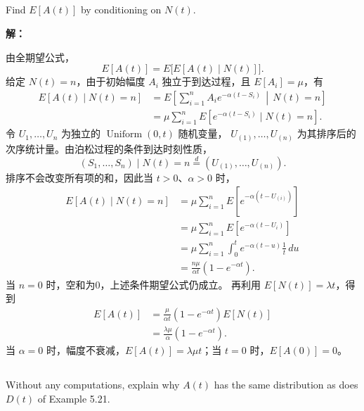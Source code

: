 \documentclass[12pt,a4paper]{article}
\begin{document}
\subsection{}

Find $E[A(t)]$ by conditioning on $N(t)$.

\begin{answerbox}
\textbf{解：}

由全期望公式，
$$
E[A(t)]=E\big[E[A(t)\mid N(t)]\big].
$$
给定 $N(t)=n$，由于初始幅度 $A_i$ 独立于到达过程，且 $E[A_i]=\mu$，有
$$
\begin{aligned}
E[A(t)\mid N(t)=n]
&=E\left[\sum_{i=1}^n A_i e^{-\alpha(t-S_i)}\,\middle|\,N(t)=n\right]\\
&=\mu\sum_{i=1}^n E[e^{-\alpha(t-S_i)}\mid N(t)=n].
\end{aligned}
$$
令 $U_1,\ldots,U_n$ 为独立的 $\operatorname{Uniform}(0,t)$ 随机变量，
$U_{(1)},\ldots,U_{(n)}$ 为其排序后的次序统计量。由泊松过程的条件到达时刻性质，
$$
(S_1,\ldots,S_n)\mid N(t)=n\overset{d}{=}(U_{(1)},\ldots,U_{(n)}).
$$
排序不会改变所有项的和，因此当 $t>0$、$\alpha>0$ 时，
$$
\begin{aligned}
E[A(t)\mid N(t)=n]
&=\mu\sum_{i=1}^n E[e^{-\alpha(t-U_{(i)})}]\\
&=\mu\sum_{i=1}^n E[e^{-\alpha(t-U_i)}]\\
&=\mu\sum_{i=1}^n\int_0^t e^{-\alpha(t-u)}\frac1t\,du\\
&=\frac{n\mu}{\alpha t}(1-e^{-\alpha t}).
\end{aligned}
$$
当 $n=0$ 时，空和为0，上述条件期望公式仍成立。
再利用 $E[N(t)]=\lambda t$，得到
$$
\begin{aligned}
E[A(t)]
&=\frac{\mu}{\alpha t}(1-e^{-\alpha t})E[N(t)]\\
&=\frac{\lambda\mu}{\alpha}(1-e^{-\alpha t}).
\end{aligned}
$$
当 $\alpha=0$ 时，幅度不衰减，$E[A(t)]=\lambda\mu t$；当 $t=0$ 时，$E[A(0)]=0$。
\end{answerbox}

\subsection{}

Without any computations, explain why $A(t)$ has the same distribution as does $D(t)$ of Example 5.21.
\end{document}
